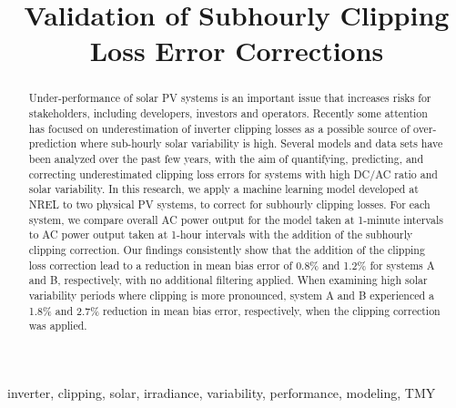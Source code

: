 \documentclass[conference]{IEEEtran}
\begin{document}
\title{Validation of Subhourly Clipping Loss Error Corrections}

\author{
    }

\maketitle

\begin{abstract}
Under-performance of solar PV systems is an important issue that increases risks for stakeholders, including developers, investors and operators. Recently some attention has focused on underestimation of inverter clipping losses as a possible source of over-prediction where sub-hourly solar variability is high. Several models and data sets have been analyzed over the past few years, with the aim of quantifying, predicting, and correcting underestimated clipping loss errors for systems with high DC/AC ratio and solar variability. In this research, we apply a machine learning model developed at NREL to two physical PV systems, to correct for subhourly clipping losses. For each system, we compare overall AC power output for the model taken at 1-minute intervals to AC power output taken at 1-hour intervals with the addition of the subhourly clipping correction. Our findings consistently show that the addition of the clipping loss correction lead to a reduction in mean bias error of 0.8\% and 1.2\% for systems A and B, respectively, with no additional filtering applied. When examining high solar variability periods where clipping is more pronounced, system A and B experienced a 1.8\% and 2.7\% reduction in mean bias error, respectively, when the clipping correction was applied.
\end{abstract}

\begin{IEEEkeywords}
inverter, clipping, solar, irradiance, variability, performance, modeling, TMY
\end{IEEEkeywords}
\end{document}
